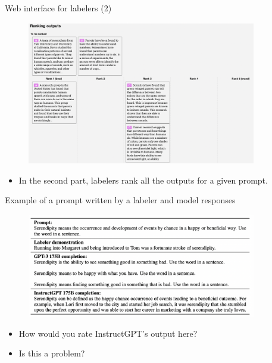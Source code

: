 \begin{vbframe}{Web interface for labelers (2)}

\vfill

\begin{figure}
\centering
\includegraphics[width = 10cm]{figure/webinterface2.png}
\end{figure}

\begin{itemize}
	\item In the second part, labelers rank all the outputs for a given prompt.
\end{itemize}

\vfill

\end{vbframe}


\begin{vbframe}{Example of a prompt written by a labeler and
model responses}

\vfill

\begin{figure}
\centering
\includegraphics[width = 10cm]{figure/labelerpromptexample.png}
\end{figure}

\begin{itemize}
	\item How would you rate InstructGPT's output here?
        \item Is this a problem?
\end{itemize}


\vfill

\end{vbframe}

